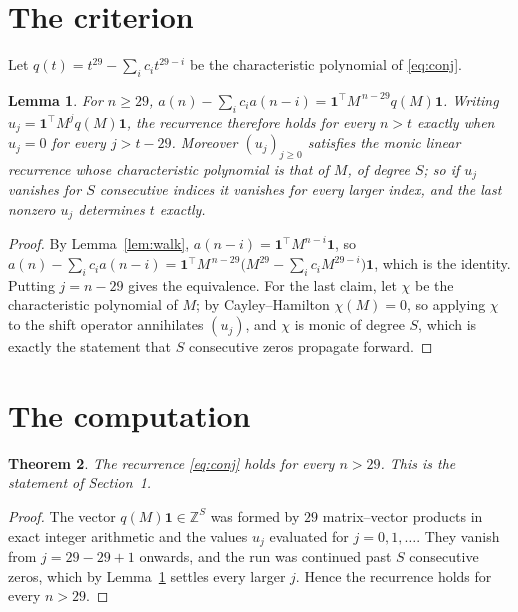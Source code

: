 \documentclass[11pt,a4paper]{article}
\theoremstyle{plain}
\newtheorem{theorem}{Theorem}
\newtheorem{lemma}[theorem]{Lemma}
\theoremstyle{definition}
\begin{document}
\section{The criterion}

Let $q(t)=t^{29}-\sum_i c_i t^{29-i}$ be the characteristic polynomial of
\eqref{eq:conj}.

\begin{lemma}\label{lem:crit}
For $n\ge29$,
$a(n)-\sum_i c_i a(n-i)=\mathbf{1}^{\!\top}M^{\,n-29}q(M)\mathbf{1}$. Writing
$u_j=\mathbf{1}^{\!\top}M^{j}q(M)\mathbf{1}$, the recurrence therefore holds for every
$n>t$ exactly when $u_j=0$ for every $j>t-29$. Moreover $(u_j)_{j\ge0}$ satisfies the
monic linear recurrence whose characteristic polynomial is that of $M$, of degree $S$; so
if $u_j$ vanishes for $S$ consecutive indices it vanishes for every larger index, and the
last nonzero $u_j$ determines $t$ exactly.
\end{lemma}

\begin{proof}
By Lemma~\ref{lem:walk}, $a(n-i)=\mathbf{1}^{\!\top}M^{n-i}\mathbf{1}$, so
$a(n)-\sum_i c_i a(n-i)
=\mathbf{1}^{\!\top}M^{\,n-29}\bigl(M^{29}-\sum_i c_i M^{29-i}\bigr)
\mathbf{1}$, which is the identity. Putting $j=n-29$ gives the equivalence. For the
last claim, let $\chi$ be the characteristic polynomial of $M$; by Cayley--Hamilton
$\chi(M)=0$, so applying $\chi$ to the shift operator annihilates $(u_j)$, and $\chi$ is
monic of degree $S$, which is exactly the statement that $S$ consecutive zeros propagate
forward.
\end{proof}

\section{The computation}

\begin{theorem}
The recurrence \eqref{eq:conj} holds for every $n>29$. This is the statement of
Section~1.
\end{theorem}

\begin{proof}
The vector $q(M)\mathbf{1}\in\mathbb{Z}^{S}$ was formed by $29$ matrix--vector
products in exact integer arithmetic and the values $u_j$ evaluated for
$j=0,1,\dots$. They vanish from $j=29-29+1$ onwards, and the run was continued past
$S$ consecutive zeros, which by Lemma~\ref{lem:crit} settles every larger $j$. Hence the
recurrence holds for every $n>29$.
\end{proof}
\end{document}
